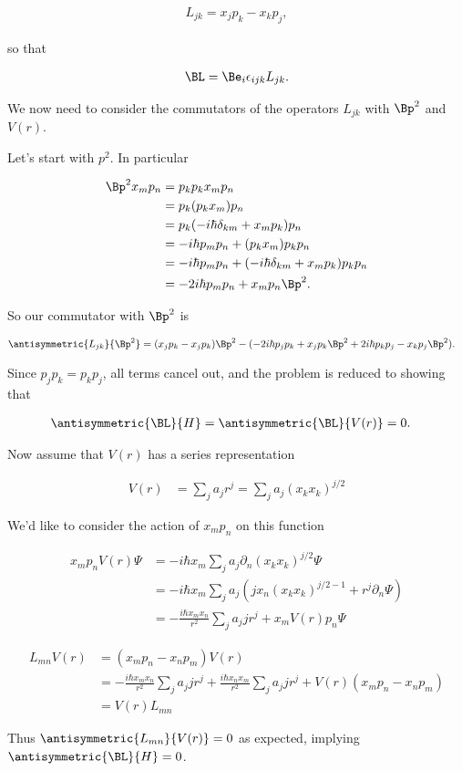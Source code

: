 \begin{align}\label{eqn:desaiCh3:1100}
L_{jk} = x_j p_k - x_k p_j,
\end{align}

so that 

\begin{align}\label{eqn:desaiCh3:1101}
\BL = \Be_i \epsilon_{ijk} L_{jk}.
\end{align}

We now need to consider the commutators of the operators $L_{jk}$ with $\Bp^2$ and $V(r)$.

Let's start with $p^2$.  In particular

\begin{align*}
\Bp^2 x_m p_n
&=
p_k p_k x_m p_n \\
&=
p_k (p_k x_m) p_n \\
&=
p_k (-i\hbar \delta_{km} + x_m p_k) p_n \\
&=
-i\hbar p_m p_n + (p_k x_m) p_k p_n \\
&=
-i\hbar p_m p_n + (-i \hbar \delta_{km} + x_m p_k ) p_k p_n \\
&=
-2 i\hbar p_m p_n + x_m p_n \Bp^2.
\end{align*}

So our commutator with $\Bp^2$ is

\begin{align*}
\antisymmetric{L_{jk}}{\Bp^2}
&=
(x_j p_k - x_j p_k) \Bp^2 
-( -2 i\hbar p_j p_k + x_j p_k \Bp^2 +2 i\hbar p_k p_j - x_k p_j \Bp^2 ).
\end{align*}

Since $p_j p_k = p_k p_j$, all terms cancel out, and the problem is reduced to showing that 

\begin{align*}
\antisymmetric{\BL}{H} &= \antisymmetric{\BL}{V(r)} = 0.
\end{align*}

Now assume that $V(r)$ has a series representation

\begin{align*}
V(r) &= \sum_j a_j r^j = \sum_j a_j (x_k x_k)^{j/2}
\end{align*}

We'd like to consider the action of $x_m p_n$ on this function

\begin{align*}
x_m p_n V(r) \Psi
&= -i \hbar x_m \sum_j a_j \partial_n (x_k x_k)^{j/2} \Psi \\
&= -i \hbar x_m \sum_j a_j (j x_n (x_k x_k)^{j/2-1} + r^j \partial_n \Psi) \\
&= -\frac{i \hbar x_m x_n}{r^2} \sum_j a_j j r^j + 
x_m V(r) p_n \Psi
\end{align*}

\begin{align*}
L_{mn} V(r) 
&=
(x_m p_n - x_n p_m) V(r) \\
&= 
-\frac{i \hbar x_m x_n}{r^2} \sum_j a_j j r^j
+\frac{i \hbar x_n x_m}{r^2} \sum_j a_j j r^j 
+ 
V(r) (x_m p_n - x_n p_m )
\\
&= 
V(r) L_{mn}
\end{align*}

Thus $\antisymmetric{L_{mn}}{V(r)} = 0$ as expected, implying $\antisymmetric{\BL}{H} = 0$.

\EndArticle
